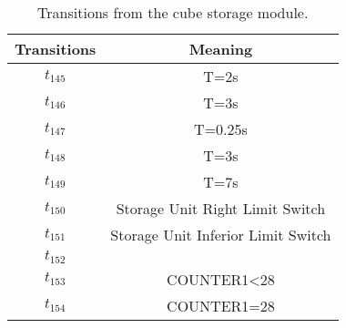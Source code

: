 \begin{table}[htbp]
\caption{Transitions from the cube storage module.}
\centering
\begin{tabular}{c|c}
Transitions & Meaning\\
\hline
\hyperlink{partialNet:tt145}{\hypertarget{partialTable:tt145}{$t_{145}$}} & T=2s\\
\hyperlink{partialNet:tt146}{\hypertarget{partialTable:tt146}{$t_{146}$}} & T=3s\\
\hyperlink{partialNet:tt147}{\hypertarget{partialTable:tt147}{$t_{147}$}} & T=0.25s\\
\hyperlink{partialNet:tt148}{\hypertarget{partialTable:tt148}{$t_{148}$}} & T=3s\\
\hyperlink{partialNet:tt149}{\hypertarget{partialTable:tt149}{$t_{149}$}} & T=7s\\
\hyperlink{partialNet:t150}{\hypertarget{partialTable:t150}{$t_{150}$}} & Storage Unit Right Limit Switch\\
\hyperlink{partialNet:t151}{\hypertarget{partialTable:t151}{$t_{151}$}} & Storage Unit Inferior Limit Switch\\
\hyperlink{partialNet:t152}{\hypertarget{partialTable:t152}{$t_{152}$}} & \\
\hyperlink{partialNet:t153}{\hypertarget{partialTable:t153}{$t_{153}$}} & COUNTER1<28\\
\hyperlink{partialNet:t154}{\hypertarget{partialTable:t154}{$t_{154}$}} & COUNTER1=28\\
\end{tabular}
\end{table}

